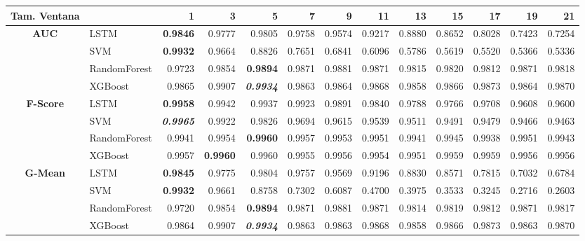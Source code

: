 \begin{table}[H]
	\centering
	\begin{adjustbox}{max width=14cm}
		\begin{tabular}{|c|l|r|r|r|r|r|r|r|r|r|r|r|}
			\hline
			\textbf{Tam. Ventana}&         &      1  &      3  &      5  &      7  &      9  &      11 &      13 &      15 &      17 &      19 &      21 \\
			\hline
			\textbf{AUC} &  LSTM & \textbf{  0.9846 } &  0.9777 &  0.9805 &  0.9758 &  0.9574 &  0.9217 &  0.8880 &  0.8652 &  0.8028 &  0.7423 &  0.7254 \\
			&  SVM & \textbf{  0.9932 } &  0.9664 &  0.8826 &  0.7651 &  0.6841 &  0.6096 &  0.5786 &  0.5619 &  0.5520 &  0.5366 &  0.5336 \\
			&  RandomForest &  0.9723 &  0.9854 & \textbf{  0.9894 } &  0.9871 &  0.9881 &  0.9871 &  0.9815 &  0.9820 &  0.9812 &  0.9871 &  0.9818 \\
			&  XGBoost &  0.9865 &  0.9907 & \textit{ \textbf{  0.9934 } } &  0.9863 &  0.9864 &  0.9868 &  0.9858 &  0.9866 &  0.9873 &  0.9864 &  0.9870 \\
			\hline
			\textbf{F-Score} &  LSTM & \textbf{  0.9958 } &  0.9942 &  0.9937 &  0.9923 &  0.9891 &  0.9840 &  0.9788 &  0.9766 &  0.9708 &  0.9608 &  0.9600 \\
			&  SVM & \textit{ \textbf{  0.9965 } } &  0.9922 &  0.9826 &  0.9694 &  0.9615 &  0.9539 &  0.9511 &  0.9491 &  0.9479 &  0.9466 &  0.9463 \\
			&  RandomForest &  0.9941 &  0.9954 & \textbf{  0.9960 } &  0.9957 &  0.9953 &  0.9951 &  0.9941 &  0.9945 &  0.9938 &  0.9951 &  0.9943 \\
			&  XGBoost &  0.9957 & \textbf{  0.9960 } &  0.9960 &  0.9955 &  0.9956 &  0.9954 &  0.9951 &  0.9959 &  0.9959 &  0.9956 &  0.9956 \\
			\hline
			\textbf{G-Mean} &  LSTM & \textbf{  0.9845 } &  0.9775 &  0.9804 &  0.9757 &  0.9569 &  0.9196 &  0.8830 &  0.8571 &  0.7815 &  0.7032 &  0.6784 \\
			&  SVM & \textbf{  0.9932 } &  0.9661 &  0.8758 &  0.7302 &  0.6087 &  0.4700 &  0.3975 &  0.3533 &  0.3245 &  0.2716 &  0.2603 \\
			&  RandomForest &  0.9720 &  0.9854 & \textbf{  0.9894 } &  0.9871 &  0.9881 &  0.9871 &  0.9814 &  0.9819 &  0.9812 &  0.9871 &  0.9817 \\
			&  XGBoost &  0.9864 &  0.9907 & \textit{ \textbf{  0.9934 } } &  0.9863 &  0.9863 &  0.9868 &  0.9858 &  0.9866 &  0.9873 &  0.9863 &  0.9870 \\

\end{tabular}
\end{adjustbox}
\end{table}
